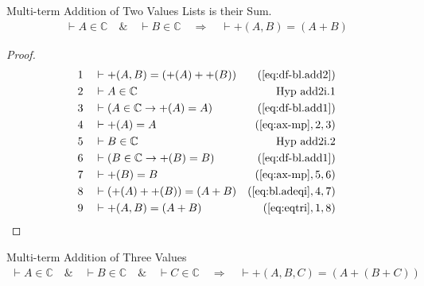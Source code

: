 \begin{lemma} Multi-term Addition of Two Values Lists is
their Sum.
\begin{align}
\vdash A \in \mathbb{C}\quad\&\quad \vdash B \in
    \mathbb{C}\quad\Rightarrow\quad \vdash +( A , B ) = ( A + B
    )\label{eq:bl.add2i}\tag{bl.add2i}
\end{align}
\end{lemma}

\begin{proof}
\begin{align}
  1 &&  & \vdash +( A , B ) = ( +( A ) + +( B ) )&(\mbox{\ref{eq:df-bl.add2}})\notag
  \\ 2 &&  & \vdash A \in \mathbb{C}&\text{Hyp~add2i.1}\notag%
  \\ 3 &&  & \vdash ( A \in \mathbb{C} \rightarrow +( A ) = A )&(\mbox{\ref{eq:df-bl.add1}})\notag
  \\ 4 &&  & \vdash +( A ) = A&(\mbox{\ref{eq:ax-mp}},2,3)\notag
  \\ 5 &&  & \vdash B \in \mathbb{C}&\text{Hyp~add2i.2}\notag%
  \\ 6 &&  & \vdash ( B \in \mathbb{C} \rightarrow +( B ) = B )&(\mbox{\ref{eq:df-bl.add1}})\notag
  \\ 7 &&  & \vdash +( B ) = B&(\mbox{\ref{eq:ax-mp}},5,6)\notag
  \\ 8 &&  & \vdash ( +( A ) + +( B ) ) = ( A + B )&(\mbox{\ref{eq:bl.adeqi}},4,7)\notag
  \\ 9 &&  & \vdash +( A , B ) = ( A + B )&(\mbox{\ref{eq:eqtri}},1,8)\notag
\end{align}
\end{proof}

\begin{lemma} Multi-term Addition of Three Values
\begin{align}
\vdash A \in \mathbb{C}\quad\&\quad \vdash B \in \mathbb{C}\quad\&\quad \vdash
    C \in \mathbb{C}\quad\Rightarrow\quad \vdash +( A , B , C ) = ( A + ( B + C
    ) )\label{eq:bl.add3i}\tag{bl.add3i}
\end{align}
\end{lemma}

